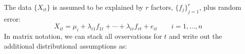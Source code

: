 \documentclass[12pt]{article}
\theoremstyle{plain}
\theoremstyle{definition}
\theoremstyle{remark}
\begin{document}
The data $\{X_{it}\}$ is assumed to be explained by $r$ factors, $\{f_j\}_{j=1}^r$,
plus random error:
\begin{equation}
  X_{it} = \mu_i + \lambda_{i1} f_{1t} + \cdots + \lambda_{ir} f_{rt} + e_{it}
  \qquad i = 1,\ldots,n
\end{equation}
In matrix notation, we can stack all ovservations for $t$ and write out the
additional distributional assumptions as:
\begin{align*}
  
\end{align*}





\end{document}
